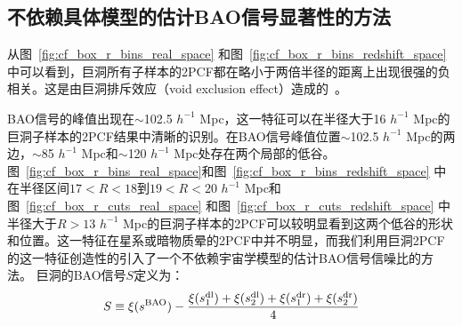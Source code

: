\subsection{不依赖具体模型的估计BAO信号显著性的方法}
\label{sec:sn}

从图~\ref{fig:cf_box_r_bins_real_space} 和图~\ref{fig:cf_box_r_bins_redshift_space} 中可以看到，巨洞所有子样本的2PCF都在略小于两倍半径的距离上出现很强的负相关。这是由巨洞排斥效应（void exclusion effect）造成的~\cite{Hamaus2014}。

BAO信号的峰值出现在$\sim$102.5  $h^{-1}$ Mpc，这一特征可以在半径大于16 $h^{-1}$ Mpc的巨洞子样本的2PCF结果中清晰的识别。在BAO信号峰值位置$\sim$102.5  $h^{-1}$ Mpc的两边，$\sim$85  $h^{-1}$ Mpc和$\sim$120  $h^{-1}$ Mpc处存在两个局部的低谷。图~\ref{fig:cf_box_r_bins_real_space}和图~\ref{fig:cf_box_r_bins_redshift_space} 中在半径区间$17<R<18$到$19<R<20$ $h^{-1}$ Mpc和图~\ref{fig:cf_box_r_cuts_real_space} 和图~\ref{fig:cf_box_r_cuts_redshift_space} 中半径大于$R>13$  $h^{-1}$ Mpc的巨洞子样本的2PCF可以较明显看到这两个低谷的形状和位置。这一特征在星系或暗物质晕的2PCF中并不明显，而我们利用巨洞2PCF的这一特征创造性的引入了一个不依赖宇宙学模型的估计BAO信号信噪比的方法。
巨洞的BAO信号$S$定义为：
\begin{equation}
S\equiv \xi(s^{\rm BAO}) - \frac{\xi(s_{\rm 1}^{\rm dl})+\xi(s_{\rm 2}^{\rm dl})+\xi(s_{\rm 1}^{\rm dr})+\xi(s_{\rm 2}^{\rm dr})}{4}
\end{equation}
